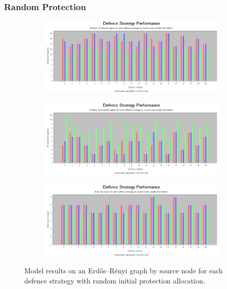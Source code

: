 \documentclass[results.tex]{subfiles}
\begin{document}
\newpage 


\subsubsection{Random Protection}



\newpage

\begin{figure}[!ht]
\centering
     \begin{subfigure}[b]{0.9\textwidth}
         \centering
         \includegraphics[width=\textwidth]{Random/RandomInfectedChart}
         \label{fig:er-ran-infected}
     \end{subfigure}
     \vfill
     \begin{subfigure}[b]{0.9\textwidth}
         \centering
         \includegraphics[width=\textwidth]{Random/RandomProtectedChart}
         \label{fig:er-ran-protected}
     \end{subfigure}
     \vfill
     \begin{subfigure}[b]{0.9\textwidth}
         \centering
         \includegraphics[width=\textwidth]{Random/RandomEndTurnChart}
         \label{fig:er-ran-end}
     \end{subfigure}
        \caption{Model results on an Erdős–Rényi graph by source node for each defence strategy with random initial protection allocation.}
        \label{fig:er-ran-charts}
\end{figure}
\end{document}
